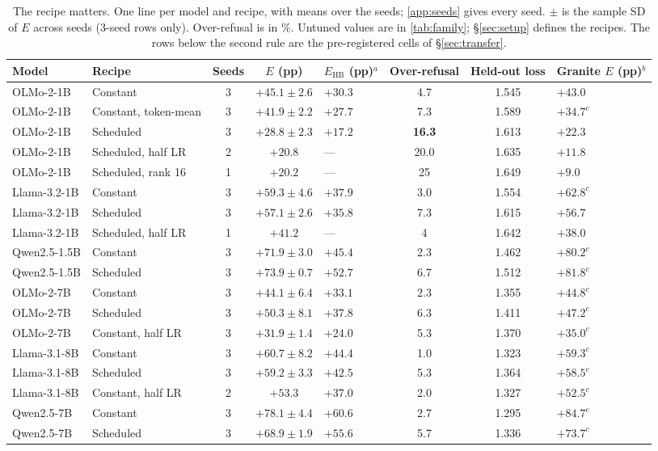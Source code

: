 \documentclass{article}
\newcommand{\Ehb}{E_{\mathrm{HB}}}
\begin{document}
\begin{table}[t]
  \caption{The recipe matters. One line per model and recipe, with means over
    the seeds; \cref{app:seeds} gives every seed. $\pm$ is the sample SD of $E$
    across seeds (3-seed rows only). Over-refusal is in \%. Untuned values are
    in \cref{tab:family}; \S\ref{sec:setup} defines the recipes. The rows below
    the second rule are the pre-registered cells of \S\ref{sec:transfer}.}
  \label{tab:recipe}
  \centering
  \small
  \setlength{\tabcolsep}{4pt}
  \begin{tabular}{@{}l l c c C{2.2cm} c c C{2.3cm}@{}}
    \toprule
    Model & Recipe & Seeds & $E$ (pp) & $\Ehb$ (pp)$^{a}$ & Over-refusal & Held-out loss & Granite $E$ (pp)$^{b}$ \\
    \midrule
    OLMo-2-1B & Constant & 3 & $+45.1 \pm 2.6$ & $+30.3$ & 4.7 & 1.545 & $+43.0$ \\
    OLMo-2-1B & Constant, token-mean & 3 & $+41.9 \pm 2.2$ & $+27.7$ & 7.3 & 1.589 & $+34.7^{c}$ \\
    OLMo-2-1B & Scheduled & 3 & $\mathbf{+28.8} \pm 2.3$ & $+17.2$ & \textbf{16.3} & 1.613 & $+22.3$ \\
    OLMo-2-1B & Scheduled, half LR & 2 & $+20.8$ & --- & 20.0 & 1.635 & $+11.8$ \\
    OLMo-2-1B & Scheduled, rank 16 & 1 & $+20.2$ & --- & 25 & 1.649 & $+9.0$ \\
    Llama-3.2-1B & Constant & 3 & $+59.3 \pm 4.6$ & $+37.9$ & 3.0 & 1.554 & $+62.8^{c}$ \\
    Llama-3.2-1B & Scheduled & 3 & $+57.1 \pm 2.6$ & $+35.8$ & 7.3 & 1.615 & $+56.7$ \\
    Llama-3.2-1B & Scheduled, half LR & 1 & $+41.2$ & --- & 4 & 1.642 & $+38.0$ \\
    \midrule
    Qwen2.5-1.5B & Constant & 3 & $+71.9 \pm 3.0$ & $+45.4$ & 2.3 & 1.462 & $+80.2^{c}$ \\
    Qwen2.5-1.5B & Scheduled & 3 & $+73.9 \pm 0.7$ & $+52.7$ & 6.7 & 1.512 & $+81.8^{c}$ \\
    OLMo-2-7B & Constant & 3 & $+44.1 \pm 6.4$ & $+33.1$ & 2.3 & 1.355 & $+44.8^{c}$ \\
    OLMo-2-7B & Scheduled & 3 & $+50.3 \pm 8.1$ & $+37.8$ & 6.3 & 1.411 & $+47.2^{c}$ \\
    OLMo-2-7B & Constant, half LR & 3 & $\mathbf{+31.9} \pm 1.4$ & $+24.0$ & 5.3 & 1.370 & $+35.0^{c}$ \\
    Llama-3.1-8B & Constant & 3 & $+60.7 \pm 8.2$ & $+44.4$ & 1.0 & 1.323 & $+59.3^{c}$ \\
    Llama-3.1-8B & Scheduled & 3 & $+59.2 \pm 3.3$ & $+42.5$ & 5.3 & 1.364 & $+58.5^{c}$ \\
    Llama-3.1-8B & Constant, half LR & 2 & $+53.3$ & $+37.0$ & 2.0 & 1.327 & $+52.5^{c}$ \\
    Qwen2.5-7B & Constant & 3 & $+78.1 \pm 4.4$ & $+60.6$ & 2.7 & 1.295 & $+84.7^{c}$ \\
    Qwen2.5-7B & Scheduled & 3 & $\mathbf{+68.9} \pm 1.9$ & $+55.6$ & 5.7 & 1.336 & $+73.7^{c}$ \\
    \bottomrule
  \end{tabular}


\end{table}
\end{document}
